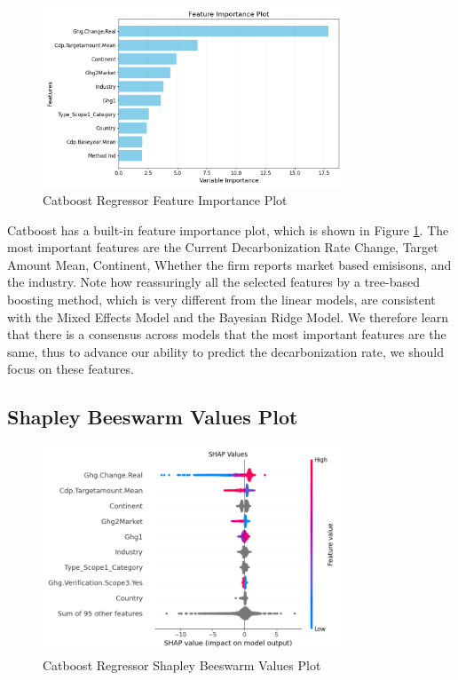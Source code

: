 \begin{figure}[H]
    \centering
    \includegraphics[width=0.8\textwidth]{figures/catboost_feature_importance.png}
    \caption{Catboost Regressor Feature Importance Plot}
    \label{fig:catboost_feature_importance}
\end{figure}
\noindent Catboost has a built-in feature importance plot, which is shown in Figure \ref{fig:catboost_feature_importance}. The most important features are the Current Decarbonization Rate Change, Target Amount Mean, Continent, Whether the firm reports market based emisisons, and the industry. Note how reassuringly all the selected features by a tree-based boosting method, which is very different from the linear models, are consistent with the Mixed Effects Model and the Bayesian Ridge Model. We therefore learn that there is a consensus across models that the most important features are the same, thus to advance our ability to predict the decarbonization rate, we should focus on these features.


\subsection{Shapley Beeswarm Values Plot}

\begin{figure}[H]
    \centering
    \includegraphics[width=0.8\textwidth]{figures/catboost_shap_values_beeswarm.png}
    \caption{Catboost Regressor Shapley Beeswarm Values Plot}
    \label{fig:catboost_shapley_values}
\end{figure}

